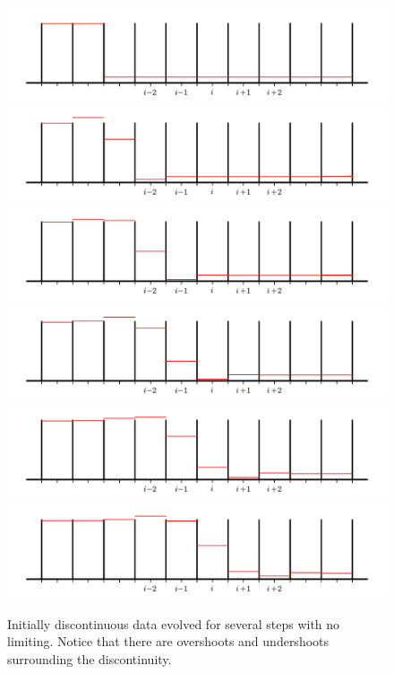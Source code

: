 \begin{figure}[h]
\centering
\includegraphics[width=0.75\linewidth]{rea-nolimit-start_001} \\
\includegraphics[width=0.75\linewidth]{rea-nolimit-start_002} \\
\includegraphics[width=0.75\linewidth]{rea-nolimit-start_003} \\
\includegraphics[width=0.75\linewidth]{rea-nolimit-start_004} \\
\includegraphics[width=0.75\linewidth]{rea-nolimit-start_005} \\
\includegraphics[width=0.75\linewidth]{rea-nolimit-start_006} 
\caption[The effect of no limiting on initially discontinuous data]{\label{fig:limitingex}Initially discontinuous data evolved for several steps with
  no limiting.  Notice that there are overshoots and undershoots
  surrounding the discontinuity.}
\end{figure}

